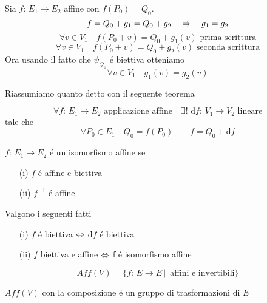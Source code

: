 \begin{prop}Sia $f:\, E_1 \to E_2 $ affine con $f(P_0)=Q_0$.
$$ f = Q_0 + g_1 = Q_0 + g_2 \quad \Rightarrow \quad g_1=g_2$$
\proof $$\forall v \in V_1 \quad f(P_0 + v ) = Q_0 + g_1(v)  \text{ prima scrittura}$$
$$ \forall v\in V_1 \quad f(P_0+v)= Q_0 + g_2(v)\text{ seconda scrittura}$$
Ora usando il fatto che $\psi_{Q_0} $ \'e biettiva otteniamo 
$$ \forall v \in V_1 \quad g_1(v)=g_2(v)$$
\endproof
\end{prop}
\spazio
Riassumiamo quanto detto con il seguente teorema
\begin{thm}\bianco
$$ \forall f:\, E_1 \to E_2 \text{ applicazione affine} \quad \exists ! \, \, \mathrm{d}f :\, V_1 \to V_2 \text{ lineare} $$
tale che
$$ \forall P_0 \in E_1 \quad Q_0 = f(P_0) \qquad f = Q_0 + \mathrm{d}f$$
\end{thm}
\newpage
\begin{defn}\bianco
$f:\, E_1 \to E_2 $ \'e un isomorfismo affine se 
\begin{itemize}
\item[(i)]$f$ \'e affine e biettiva
\item[(ii)]$f^{-1}$ \'e affine 
\end{itemize}
\end{defn}
\begin{prop}Valgono i seguenti fatti
\begin{itemize}
\item[(i)] $f$ \'e biettiva $ \Leftrightarrow$ $ \mathrm{d}f$ \'e biettiva
\item[(ii)] $f$ biettiva e affine $\Leftrightarrow$ f \'e isomorfismo affine
\end{itemize}
\end{prop}
\spazio
\begin{defn}
$$ Aff(V) = \{ f :\, E \to E \, \vert \, \text{ affini e invertibili}  \}$$
\begin{oss}$Aff(V)$ con la composizione \'e un gruppo di trasformazioni di $E$
\end{oss}
\end{defn}
\newpage
